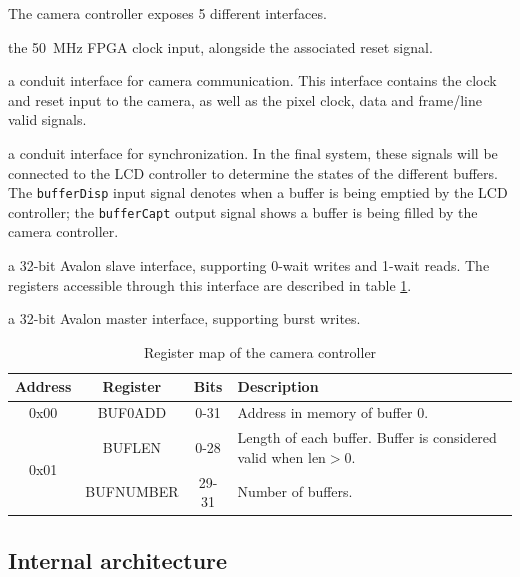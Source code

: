 \documentclass[12pt,a4paper]{article}
\begin{document}
The camera controller exposes 5 different interfaces.
\begin{description}[nosep]
	\item[In black:] the \SI{50}{\mega\hertz} FPGA clock input, alongside the associated reset signal.
	\item[In yellow:] a conduit interface for camera communication. This interface contains the clock and reset input to the camera, as well as the pixel clock, data and frame/line valid signals.
	\item[In purple:] a conduit interface for synchronization. In the final system, these signals will be connected to the LCD controller to determine the states of the different buffers. The \texttt{bufferDisp} input signal denotes when a buffer is being emptied by the LCD controller; the \texttt{bufferCapt} output signal shows a buffer is being filled by the camera controller.
	\item[In green:] a 32-bit Avalon slave interface, supporting 0-wait writes and 1-wait reads. The registers accessible through this interface are described in table \ref{tab:map}.
	\item[In red:] a 32-bit Avalon master interface, supporting burst writes.
\end{description}

\begin{table}[ht]
	\centering
	\begin{tabularx}{\linewidth}{|c|c|c|X|}
		\hline
		Address & Register & Bits & Description \\
		\hline
		\hline
		0x00 & BUF0ADD & 0-31 & Address in memory of buffer 0. \\
		\hline
		\multirow{2}{*}{0x01} & BUFLEN & 0-28 & Length of each buffer. Buffer is considered valid when $\text{len} > 0$. \\
		& BUFNUMBER & 29-31 & Number of buffers. \\
		\hline
	\end{tabularx}
	\caption{Register map of the camera controller}
	\label{tab:map}
\end{table}

\subsection{Internal architecture}
\end{document}
